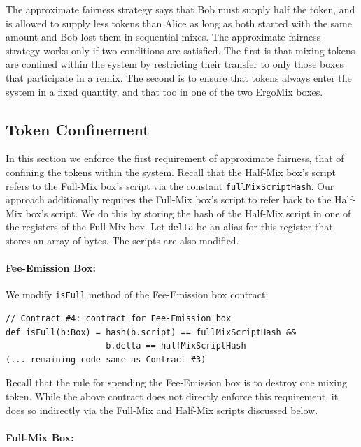 \documentclass[runningheads]{llncs}
\newcommand{\mixname}{ErgoMix\xspace}
\begin{document}
The approximate fairness strategy says that Bob must supply half the token, and is allowed to supply less tokens than Alice as long as both started with the same amount and Bob lost them in sequential mixes.
The approximate-fairness strategy works only if two conditions are satisfied. The first is that mixing tokens are confined within the system by restricting their transfer to only those boxes that participate in a remix. 
The second is to ensure that tokens always enter the system in a fixed quantity, and that too in one of the two \mixname boxes. 

\subsection{Token Confinement}

In this section we enforce the first requirement of approximate fairness, that of confining the tokens within the system. 
Recall that the Half-Mix box's script refers to the Full-Mix box's script via the constant \texttt{fullMixScriptHash}. Our approach additionally requires the Full-Mix box's script to refer back to the Half-Mix box's script. We do this by storing the hash of the Half-Mix script in one of the registers of the Full-Mix box. Let \texttt{delta} be an alias for this register that stores an array of bytes. The scripts are also modified.

\paragraph{Fee-Emission Box:}
We modify \texttt{isFull} method of the Fee-Emission box contract:

{\small
\begin{Verbatim}[frame=single]
// Contract #4: contract for Fee-Emission box
def isFull(b:Box) = hash(b.script) == fullMixScriptHash && 
                    b.delta == halfMixScriptHash
(... remaining code same as Contract #3)                    
\end{Verbatim}
}

Recall that the rule for spending the Fee-Emission box is to destroy one mixing token. While the above contract does not directly enforce this requirement, it does so indirectly via the Full-Mix and Half-Mix scripts discussed below.

\paragraph{Full-Mix Box:}
\end{document}
